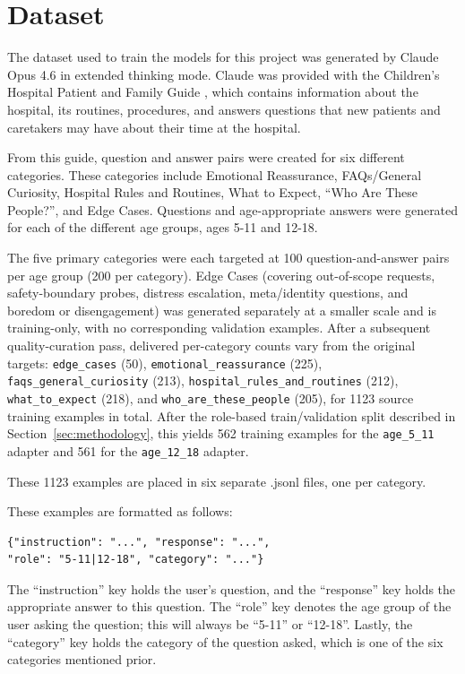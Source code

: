 \documentclass[ASNA,twocolumn]{USG} %
\begin{document}
\section{Dataset}\label{sec3}

The dataset used to train the models for this project was generated by Claude Opus 4.6 in extended thinking mode. Claude was provided with the Children's Hospital Patient and Family Guide \cite{hospitalguide}, which contains information about the hospital, its routines, procedures, and answers questions that new patients and caretakers may have about their time at the hospital.

From this guide, question and answer pairs were created for six different categories. These categories include Emotional Reassurance, FAQs/General Curiosity, Hospital Rules and Routines, What to Expect, ``Who Are These People?'', and Edge Cases. Questions and age-appropriate answers were generated for each of the different age groups, ages 5-11 and 12-18.

The five primary categories were each targeted at 100 question-and-answer pairs per age group (200 per category). Edge Cases (covering out-of-scope requests, safety-boundary probes, distress escalation, meta/identity questions, and boredom or disengagement) was generated separately at a smaller scale and is training-only, with no corresponding validation examples. After a subsequent quality-curation pass, delivered per-category counts vary from the original targets: \texttt{edge\_cases} (50), \texttt{emotional\_reassurance} (225), \texttt{faqs\_general\_curiosity} (213), \texttt{hospital\_rules\_and\_routines} (212), \texttt{what\_to\_expect} (218), and \texttt{who\_are\_these\_people} (205), for 1123 source training examples in total. After the role-based train/validation split described in Section~\ref{sec:methodology}, this yields 562 training examples for the \texttt{age\_5\_11} adapter and 561 for the \texttt{age\_12\_18} adapter.

These 1123 examples are placed in six separate .jsonl files, one per category.

These examples are formatted as follows:

\begin{verbatim}
{"instruction": "...", "response": "...",
"role": "5-11|12-18", "category": "..."}
\end{verbatim}

The ``instruction'' key holds the user's question, and the ``response'' key holds the appropriate answer to this question. The ``role'' key denotes the age group of the user asking the question; this will always be ``5-11'' or ``12-18''. Lastly, the ``category'' key holds the category of the question asked, which is one of the six categories mentioned prior.
\end{document}
